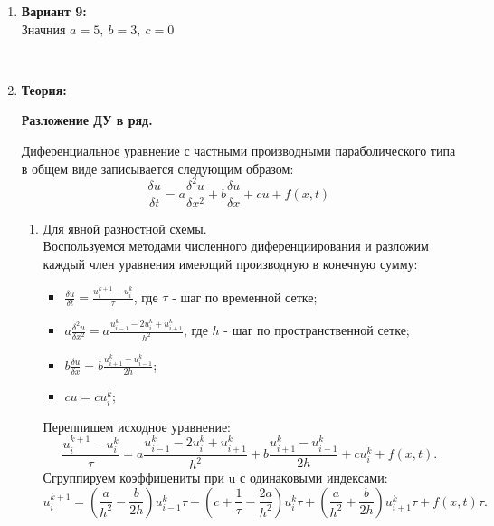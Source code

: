 \documentclass[12pt]{article}
\begin{document}
\begin{enumerate}
        \item \textbf{Вариант 9:}\\
        Значния $a = 5,~ b = 3,~ c = 0$
        \begin{figure}[h]
            \label{ris:image}
        \end{figure}\\
        \item \textbf{Теория:}\\
        \begin{center}  \textbf{Разложение ДУ в ряд.} \end{center}
    Диференциальное уравнение с частными производными параболического типа в общем виде записывается следующим образом: 
    $$\frac{\delta u}{\delta t} =a\frac{\delta^2 u}{\delta x^2}+b\frac{\delta u}{\delta x}+cu+f(x,t)$$
    \begin{enumerate}
    \item Для явной разностной схемы.
        \\Воспользуемся методами численного диференциирования и разложим каждый член уравнения имеющий производную в конечную сумму:
        \begin{itemize}
            \item $\frac{\delta u}{\delta t}=\frac{u_i^{k+1}-u_i^{k}}{\tau}$, где  $\tau$ - шаг по временной сетке;
            \item $a\frac{\delta^2 u}{\delta x^2} = a\frac{u_{i-1}^k-2u_{i}^k+u_{i+1}^k}{h^2}$, где  $h$ - шаг по пространственной сетке;
            \item $b\frac{\delta u}{\delta x} = b\frac{u_{i+1}^k-u_{i-1}^k}{2h}$;
            \item $cu = cu_{i}^k$;
        \end{itemize}
        Переппишем исходное уравнение:
        $$\frac{u_i^{k+1}-u_i^{k}}{\tau} =a\frac{u_{i-1}^k-2u_{i}^k+u_{i+1}^k}{h^2}+b\frac{u_{i+1}^k-u_{i-1}^k}{2h}+cu_{i}^k+f(x,t).$$
        Сгруппируем коэффицениты при u с одинаковыми индексами:
        $$u_i^{k+1} = \left(\frac{a}{h^2}-\frac{b}{2h} \right)u_{i-1}^k\tau + \left(c+\frac{1}{\tau}-\frac{2a}{h^2}\right)u_i^k\tau +
        \left(\frac{a}{h^2}+\frac{b}{2h}\right)u_{i+1}^k\tau+f(x,t)\tau.$$

\end{enumerate}
\end{enumerate}
\end{document}
